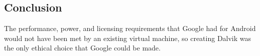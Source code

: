 \documentclass[11pt]{article}
\begin{document}
\begin{multicols}{2}


\section{Conclusion} %
\label{sec:conclusion}

The performance, power, and licensing requirements that Google had for Android
would not have been met by an existing virtual machine, so creating Dalvik was
the only ethical choice that Google could be made. 


\end{multicols}
\newpage

\nocite{*}


\end{document}
